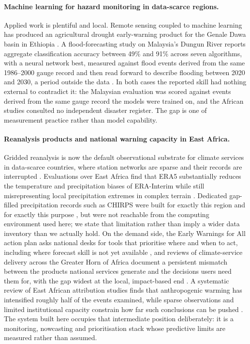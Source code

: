 \documentclass[preprint,12pt]{elsarticle}
\begin{document}
\paragraph{Machine learning for hazard monitoring in data-scarce regions.}
Applied work is plentiful and local. Remote sensing coupled to machine learning
has produced an agricultural drought early-warning product for the Genale Dawa
basin in Ethiopia \cite{alemu2025}. A flood-forecasting study on Malaysia's
Dungun River reports aggregate classification accuracy between 49\% and 91\%
across seven algorithms, with a neural network best, measured against flood
events derived from the same 1986--2000 gauge record and then read forward to
describe flooding between 2020 and 2030, a period outside the data
\cite{hadi2024}. In both cases the reported skill had nothing external to
contradict it: the Malaysian evaluation was scored against events derived from
the same gauge record the models were trained on, and the African studies
consulted no independent disaster register. The gap is one of measurement
practice rather than model capability.

\paragraph{Reanalysis products and national warning capacity in East Africa.}
Gridded reanalysis is now the default observational substrate for climate
services in data-scarce countries, where station networks are sparse and their
records are interrupted \cite{hersbach2020}. Evaluations over East Africa find
that ERA5 substantially reduces the temperature and precipitation biases of
ERA-Interim while still misrepresenting local precipitation extremes in complex
terrain \cite{gleixner2020}. Dedicated gap-filled precipitation records such as
CHIRPS were built for exactly this region and for exactly this purpose
\cite{funk2015}, but were not reachable from the computing environment used
here; we state that limitation rather than imply a wider data inventory than we
actually hold. On the demand side, the Early Warnings for All action plan asks
national desks for tools that prioritise where and when to act, including where
forecast skill is not yet available \cite{wmo2023}, and reviews of
climate-service delivery across the Greater Horn of Africa document a
persistent mismatch between the products national services generate and the
decisions users need them for, with the gap widest at the local, impact-based
end \cite{venning2025}. A systematic review of East African attribution studies
finds that anthropogenic warming has intensified roughly half of the events
examined, while sparse observations and limited institutional capacity
constrain how far such conclusions can be pushed \cite{baumgart2026}. The
system built here occupies that intermediate position deliberately: it is a
monitoring, nowcasting and prioritisation stack whose predictive limits are
measured rather than assumed.
\end{document}
